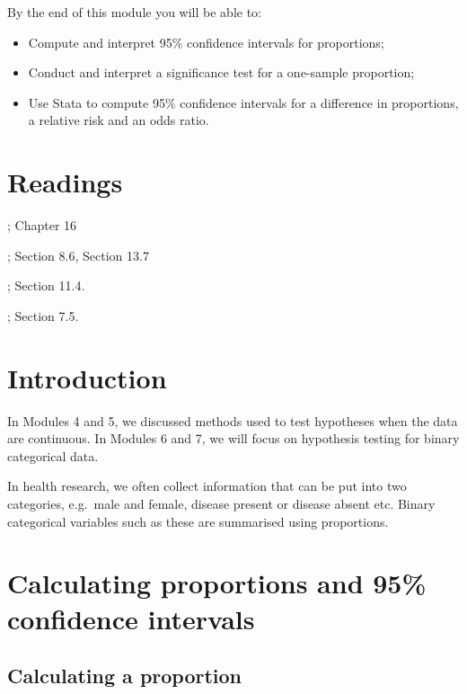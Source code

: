 \documentclass[
]{memoir}
\providecommand{\tightlist}{%
  \setlength{\itemsep}{0pt}\setlength{\parskip}{0pt}}
\begin{document}
By the end of this module you will be able to:

\begin{itemize}
\tightlist
\item
  Compute and interpret 95\% confidence intervals for proportions;
\item
  Conduct and interpret a significance test for a one-sample proportion;
\item
  Use Stata to compute 95\% confidence intervals for a difference in proportions, a relative risk and an odds ratio.
\end{itemize}

\hypertarget{readings-5}{%
\section*{Readings}\label{readings-5}}

\citet{kirkwood_sterne01}; Chapter 16

\citet{bland15}; Section 8.6, Section 13.7

\citet{juul_frydenberg14}; Section 11.4.

\citet{acock10}; Section 7.5.

\hypertarget{introduction-4}{%
\section{Introduction}\label{introduction-4}}

In Modules 4 and 5, we discussed methods used to test hypotheses when the data are continuous. In Modules 6 and 7, we will focus on hypothesis testing for binary categorical data.

In health research, we often collect information that can be put into two categories, e.g.~male and female, disease present or disease absent etc. Binary categorical variables such as these are summarised using proportions.

\hypertarget{calculating-proportions-and-95-confidence-intervals}{%
\section{Calculating proportions and 95\% confidence intervals}\label{calculating-proportions-and-95-confidence-intervals}}

\hypertarget{calculating-a-proportion}{%
\subsection{Calculating a proportion}\label{calculating-a-proportion}}
\end{document}
